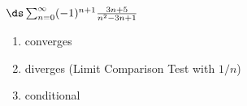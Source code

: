 {$\ds \sum_{n=0}^\infty (-1)^{n+1}\frac{3n+5}{n^2-3n+1}$
}
{\begin{enumerate}
	\item converges
	\item	diverges (Limit Comparison Test with $1/n$)
	\item conditional
\end{enumerate}
}